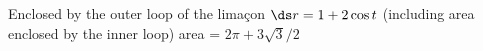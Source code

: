 {Enclosed by the outer loop of the lima\c con $\ds r=1+2\cos t$ (including area enclosed by the inner loop)}
{area = $2\pi+3\sqrt{3}/2$
}

